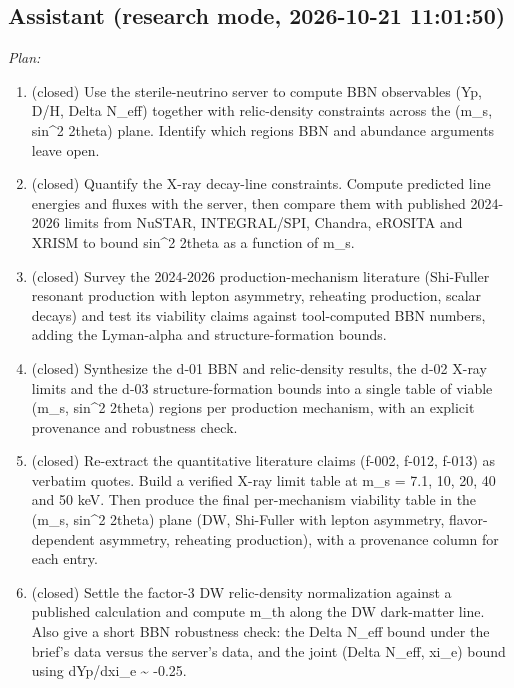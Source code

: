\documentclass[11pt,a4paper]{article}
\begin{document}
\subsection*{Assistant \small(research mode, 2026-10-21 11:01:50)}
\textit{Plan:}\begin{enumerate}
  \item (closed) Use the sterile-neutrino server to compute BBN observables (Yp, D/H, Delta N\_eff) together with relic-density constraints across the (m\_s, sin\textasciicircum{}2 2theta) plane. Identify which regions BBN and abundance arguments leave open.
  \item (closed) Quantify the X-ray decay-line constraints. Compute predicted line energies and fluxes with the server, then compare them with published 2024-2026 limits from NuSTAR, INTEGRAL/SPI, Chandra, eROSITA and XRISM to bound sin\textasciicircum{}2 2theta as a function of m\_s.
  \item (closed) Survey the 2024-2026 production-mechanism literature (Shi-Fuller resonant production with lepton asymmetry, reheating production, scalar decays) and test its viability claims against tool-computed BBN numbers, adding the Lyman-alpha and structure-formation bounds.
  \item (closed) Synthesize the d-01 BBN and relic-density results, the d-02 X-ray limits and the d-03 structure-formation bounds into a single table of viable (m\_s, sin\textasciicircum{}2 2theta) regions per production mechanism, with an explicit provenance and robustness check.
  \item (closed) Re-extract the quantitative literature claims (f-002, f-012, f-013) as verbatim quotes. Build a verified X-ray limit table at m\_s = 7.1, 10, 20, 40 and 50 keV. Then produce the final per-mechanism viability table in the (m\_s, sin\textasciicircum{}2 2theta) plane (DW, Shi-Fuller with lepton asymmetry, flavor-dependent asymmetry, reheating production), with a provenance column for each entry.
  \item (closed) Settle the factor-3 DW relic-density normalization against a published calculation and compute m\_th along the DW dark-matter line. Also give a short BBN robustness check: the Delta N\_eff bound under the brief's data versus the server's data, and the joint (Delta N\_eff, xi\_e) bound using dYp/dxi\_e \textasciitilde{} -0.25.
\end{enumerate}
\end{document}
